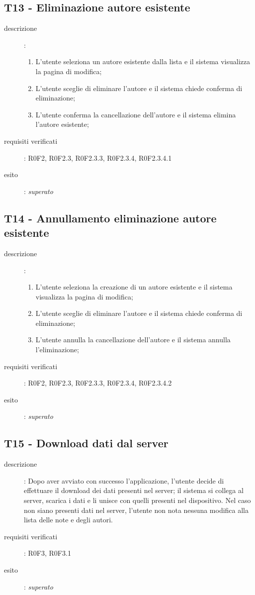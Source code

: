 \subsection{T13 - Eliminazione autore esistente}
\begin{description}
\item[descrizione]: \hfill
	\begin{enumerate}
	\item L'utente seleziona un autore esistente dalla lista e il sistema visualizza la pagina di modifica;
	\item L'utente sceglie di eliminare l'autore e il sistema chiede conferma di eliminazione;
	\item L'utente conferma la cancellazione dell'autore e il sistema elimina l'autore esistente;
	\end{enumerate}
\item[requisiti verificati]: R0F2, R0F2.3, R0F2.3.3, R0F2.3.4, R0F2.3.4.1
\item[esito]: \emph{superato}
\end{description}

\subsection{T14 - Annullamento eliminazione autore esistente}
\begin{description}
\item[descrizione]: \hfill
	\begin{enumerate}
	\item L'utente seleziona la creazione di un autore esistente e il sistema visualizza la pagina di modifica;
	\item L'utente sceglie di eliminare l'autore e il sistema chiede conferma di eliminazione;
	\item L'utente annulla la cancellazione dell'autore e il sistema annulla l'eliminazione;
	\end{enumerate}
\item[requisiti verificati]: R0F2, R0F2.3, R0F2.3.3, R0F2.3.4, R0F2.3.4.2
\item[esito]: \emph{superato}
\end{description}

\subsection{T15 - Download dati dal server}
\begin{description}
\item[descrizione]: Dopo aver avviato con successo l'applicazione, l'utente decide di effettuare il download dei dati presenti nel server; il sistema si collega al server, scarica i dati e li unisce con quelli presenti nel dispositivo.
Nel caso non siano presenti dati nel server, l'utente non nota nessuna modifica alla lista delle note e degli autori.
\item[requisiti verificati]: R0F3, R0F3.1
\item[esito]: \emph{superato}
\end{description}

